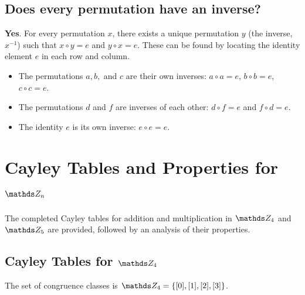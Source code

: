 \documentclass[10pt]{article}
\theoremstyle{definition}
\theoremstyle{plain}
\numberwithin{equation}{section}
\begin{document}
\subsection*{Does every permutation have an inverse?}
\textbf{Yes}. For every permutation $x$, there exists a unique permutation $y$ (the inverse, $x^{-1}$) such that $x \circ y = e$ and $y \circ x = e$. These can be found by locating the identity element $e$ in each row and column.
\begin{itemize}
  \item The permutations $a, b,$ and $c$ are their own inverses: $a \circ a = e$, $b \circ b = e$, $c \circ c = e$.
  \item The permutations $d$ and $f$ are inverses of each other: $d \circ f = e$ and $f \circ d = e$.
  \item The identity $e$ is its own inverse: $e \circ e = e$.
\end{itemize}



\newpage

\section*{Cayley Tables and Properties for $\setZ_n$}

The completed Cayley tables for addition and multiplication in $\setZ_4$ and $\setZ_5$ are provided, followed by an analysis of their properties.

\subsection*{Cayley Tables for $\setZ_4$}
The set of congruence classes is $\setZ_4 = \{[0], [1], [2], [3]\}$.
\end{document}
